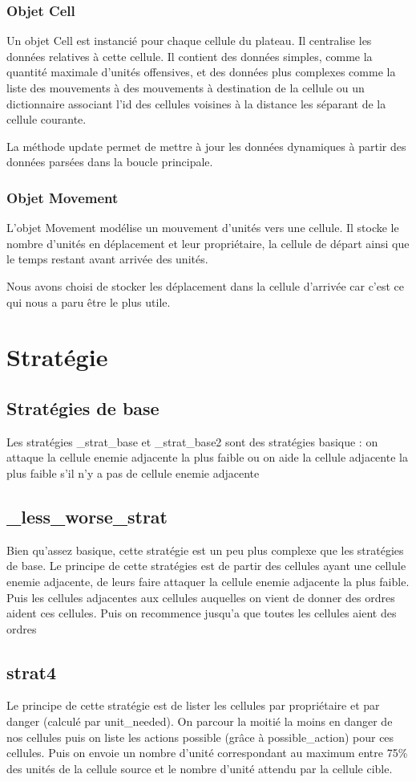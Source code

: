 \documentclass{rapport}
\begin{document}
			\subsection{Objet Cell}
Un objet Cell est instancié pour chaque cellule du plateau. Il centralise les
données relatives à cette cellule. Il contient des données simples, comme la
quantité maximale d'unités offensives, et des données plus complexes comme la
liste des mouvements à des mouvements à destination de la cellule ou un
dictionnaire associant l'id des cellules voisines à la distance les séparant de
la cellule courante.

La méthode update permet de mettre à jour les données dynamiques à partir des
données parsées dans la boucle principale.
			\subsection{Objet Movement}
L'objet Movement modélise un mouvement d'unités vers une cellule. Il stocke le
nombre d'unités en déplacement et leur propriétaire, la cellule de départ ainsi
que le temps restant avant arrivée des unités.

Nous avons choisi de stocker les déplacement dans la cellule d'arrivée car c'est
ce qui nous a paru être le plus utile.


	\chapter{Stratégie}
		\section{Stratégies de base}
		Les stratégies \_strat\_base et \_strat\_base2 sont des stratégies basique : on attaque la cellule enemie adjacente la plus faible ou on aide la cellule adjacente la plus faible s'il n'y a pas de cellule enemie adjacente
		\section{\_less\_worse\_strat}
			Bien qu'assez basique, cette stratégie est un peu plus complexe que les stratégies de base.
			Le principe de cette stratégies est de partir des cellules ayant une cellule enemie adjacente, de leurs faire attaquer la cellule enemie adjacente la plus faible. Puis les cellules adjacentes aux cellules auquelles on vient de donner des ordres aident ces cellules.
			Puis on recommence jusqu'a que toutes les cellules aient des ordres
		\section{strat4}
			Le principe de cette stratégie est de lister les cellules par propriétaire et par
			danger (calculé par unit\_needed). On parcour la moitié la moins en danger de nos cellules puis on liste les actions possible (grâce à possible\_action) pour ces cellules.
			Puis on envoie un nombre d'unité correspondant au maximum entre 75\% des unités de la cellule source et le nombre d'unité attendu par la cellule cible.
\end{document}
